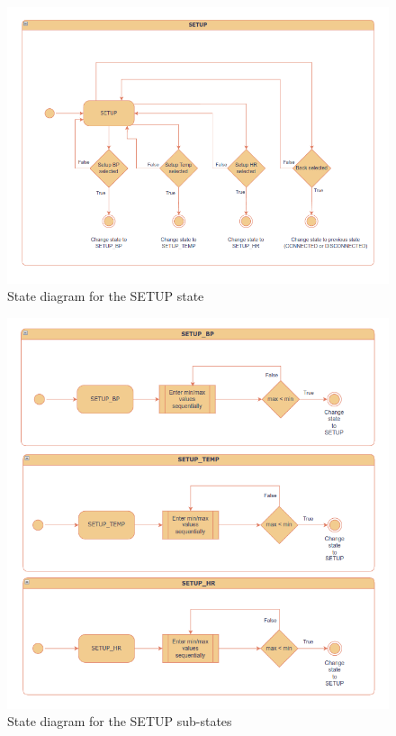 \begin{figure}[H]
	\centering
	\includegraphics[scale=0.8]{diagrams/states_setup}
	\caption{State diagram for the SETUP state}
	\label{fig:states_setup}
\end{figure}

\begin{figure}[H]
	\centering
	\includegraphics[scale=0.8]{diagrams/states_setup_substates}
	\caption{State diagram for the SETUP sub-states}
	\label{fig:states_setup_substates}
\end{figure}

